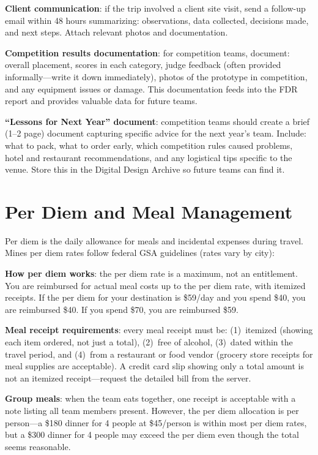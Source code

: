 \textbf{Client communication}: if the trip involved a client site visit, send a follow-up email within 48 hours summarizing: observations, data collected, decisions made, and next steps. Attach relevant photos and documentation.

\textbf{Competition results documentation}: for competition teams, document: overall placement, scores in each category, judge feedback (often provided informally---write it down immediately), photos of the prototype in competition, and any equipment issues or damage. This documentation feeds into the FDR report and provides valuable data for future teams.

\textbf{``Lessons for Next Year'' document}: competition teams should create a brief (1--2 page) document capturing specific advice for the next year's team. Include: what to pack, what to order early, which competition rules caused problems, hotel and restaurant recommendations, and any logistical tips specific to the venue. Store this in the Digital Design Archive so future teams can find it.



\section{Per Diem and Meal Management}
Per diem is the daily allowance for meals and incidental expenses during travel. Mines per diem rates follow federal GSA guidelines (rates vary by city):

\textbf{How per diem works}: the per diem rate is a maximum, not an entitlement. You are reimbursed for actual meal costs up to the per diem rate, with itemized receipts. If the per diem for your destination is \$59/day and you spend \$40, you are reimbursed \$40. If you spend \$70, you are reimbursed \$59.

\textbf{Meal receipt requirements}: every meal receipt must be: (1)~itemized (showing each item ordered, not just a total), (2)~free of alcohol, (3)~dated within the travel period, and (4)~from a restaurant or food vendor (grocery store receipts for meal supplies are acceptable). A credit card slip showing only a total amount is not an itemized receipt---request the detailed bill from the server.

\textbf{Group meals}: when the team eats together, one receipt is acceptable with a note listing all team members present. However, the per diem allocation is per person---a \$180 dinner for 4 people at \$45/person is within most per diem rates, but a \$300 dinner for 4 people may exceed the per diem even though the total seems reasonable.

